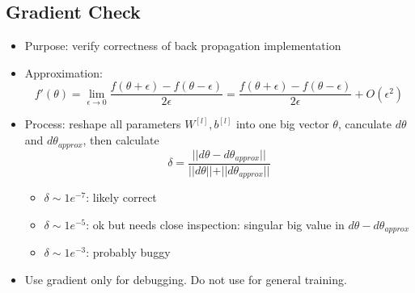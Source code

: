 \subsection{Gradient Check}
\begin{itemize}
  \item Purpose: verify correctness of back propagation implementation
  \item Approximation: \[f'(\theta)=\displaystyle\lim_{\epsilon\rightarrow 0}\frac{f(\theta+\epsilon)-f(\theta-\epsilon)}{2\epsilon}=\frac{f(\theta+\epsilon)-f(\theta-\epsilon)}{2\epsilon}+O(\epsilon^2)\]
  \item Process: reshape all parameters $W^{[l]}, b^{[l]}$ into one big vector $\theta$, canculate $d\theta$ and $d\theta_{approx}$, then calculate
  \[\delta=\frac{\vert\vert d\theta-d\theta_{approx}\vert\vert}{\vert\vert d\theta\vert\vert+\vert\vert d\theta_{approx}\vert\vert}\]
  \begin{itemize}
    \item $\delta\sim 1e^{-7}$: likely correct
    \item $\delta\sim 1e^{-5}$: ok but needs close inspection: singular big value in $d\theta-d\theta_{approx}$
    \item $\delta\sim 1e^{-3}$: probably buggy 
  \end{itemize}
  \item Use gradient only for debugging. Do not use for general training. 
\end{itemize}
\ifx\PREAMBLE\undefined

\fi